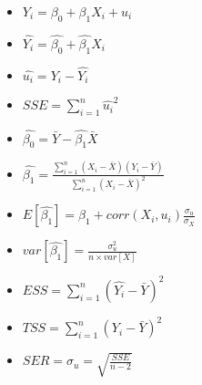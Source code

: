 \documentclass{article}
\title{}
\author{}
\date{}
\begin{document}
\begin{itemize}
		\item $Y_i=\beta_0+\beta_1 X_i+u_i$
		\item $\hat{Y_i}=\hat{\beta_0}+\hat{\beta_1} X_i$
		\item $\hat{u_i}=Y_i-\hat{Y_i}$
		\item $SSE=\displaystyle \sum^n_{i=1} \hat{u_i}^2$
		\item $\hat{\beta_0} = \bar{Y}-\hat{\beta_1}\bar{X}	$
		\item $ \hat{\beta_1} = \displaystyle\frac{\displaystyle\sum^n_{i=1} (X_i-\bar{X})(Y_i-\bar{Y})}{\displaystyle\sum^n_{i=1} (X_i-\bar{X})^2}$
		\item $E[\hat{\beta_1}]= \beta_1+ corr(X_i, u_i)\frac{\sigma_{u}}{\sigma_X}$
		\item $var[\hat{\beta_1}] = \displaystyle\frac{\sigma_u^2}{n \times var[X]}$
		\item $ESS = \displaystyle \sum^n_{i=1} (\hat{Y_i}-\bar{Y})^2$
		\item $TSS = \displaystyle \sum^n_{i=1} (Y_i-\bar{Y})^2$
		\item $SER = \sigma_u= \sqrt{\displaystyle\frac{SSE}{n-2}}$
\end{itemize}
\end{document}
